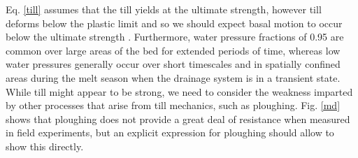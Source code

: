 \documentclass[review]{igs}
\begin{document}
Eq. \ref{till} assumes that the till yields at the ultimate strength, however till deforms below the plastic limit and so we should expect basal motion to occur below the ultimate strength \citep[e.g.][]{Iverson1994}. Furthermore, water pressure fractions of 0.95 are common over large areas of the bed for extended periods of time, whereas low water pressures generally occur over short timescales and in spatially confined areas during the melt season when the drainage system is in a transient state. While till might appear to be strong, we need to consider the weakness imparted by other processes that arise from till mechanics, such as ploughing. Fig. \ref{md} shows that ploughing does not provide a great deal of resistance when measured in field experiments, but an explicit expression for ploughing should allow to show this directly. 

\end{document}
